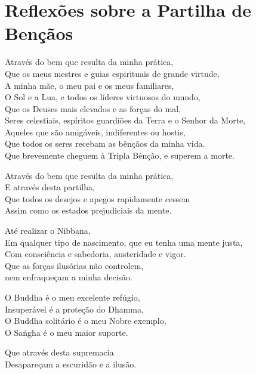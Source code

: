 \documentclass[
  babelLanguage=english,
  final,
  webversion,
]{chantingbook}
\begin{document}
\chapter[Partilha de Bençãos]{Reflexões sobre a Partilha de Bençãos}

\enlargethispage{2\baselineskip}

\begin{leader}
\end{leader}


Através do bem que resulta da minha prática,\\
Que os meus mestres e guias espirituais de grande virtude,\\
A minha mãe, o meu pai e os meus familiares,\\
O Sol e a Lua, e todos os líderes virtuosos do mundo,\\
Que os Deuses mais elevados e as forças do mal,\\
Seres celestiais, espíritos guardiões da Terra e o Senhor da Morte,\\
Aqueles que são amigáveis, indiferentes ou hostis,\\
Que todos os seres recebam as bênçãos da minha vida.\\
Que brevemente cheguem à Tripla Bênção, e superem a morte.

Através do bem que resulta da minha prática,\\
E através desta partilha,\\
Que todos os desejos e apegos rapidamente cessem\\
Assim como os estados prejudiciais da mente.

Até realizar o Nibbana,\\
Em qualquer tipo de nascimento, que eu tenha uma mente justa,\\
Com consciência e sabedoria, austeridade e vigor.\\
Que as forças ilusórias não controlem,\\
nem enfraqueçam a minha decisão.

O Buddha é o meu excelente refúgio,\\
Insuperável é a proteção do Dhamma,\\
O Buddha solitário é o meu Nobre exemplo,\\
O Saṅgha é o meu maior suporte.

Que através desta supremacia\\
Desapareçam a escuridão e a ilusão.
\end{document}
